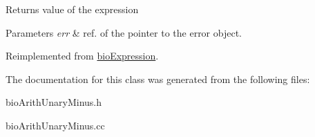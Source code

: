\begin{DoxyReturn}{Returns}
value of the expression 
\end{DoxyReturn}

\begin{DoxyParams}{Parameters}
{\em err} & ref. of the pointer to the error object. \\
\hline
\end{DoxyParams}


Reimplemented from \hyperlink{classbio_expression_af58662a5d4d456f15bc4f2c9bd4f8a5b}{bio\+Expression}.



The documentation for this class was generated from the following files\+:\begin{DoxyCompactItemize}
\item 
bio\+Arith\+Unary\+Minus.\+h\item 
bio\+Arith\+Unary\+Minus.\+cc\end{DoxyCompactItemize}
